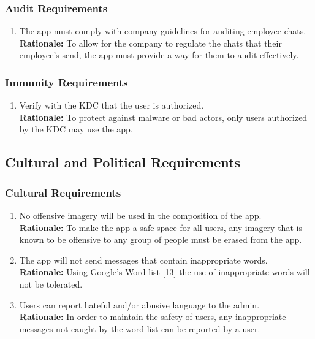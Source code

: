 \documentclass[]{article}
\begin{document}
\subsubsection{Audit Requirements}
\label{ssub:audit_requirements}
\begin{enumerate}[{SR-AU}1. ]
	\item The app must comply with company guidelines for auditing employee chats.
	      \\\textbf{Rationale:} To allow for the company to regulate the chats that their employee’s send, the app must provide a way for them to audit effectively.
\end{enumerate}

\subsubsection{Immunity Requirements}
\label{ssub:immunity_requirements}
\begin{enumerate}[{SR-IM}1. ]
	\item Verify with the KDC that the user is authorized.
	      \\\textbf{Rationale:} To protect against malware or bad actors, only users authorized by the KDC may use the app.
\end{enumerate}


\subsection{Cultural and Political Requirements}
\label{sub:cultural_and_political_requirements}

\subsubsection{Cultural Requirements}
\label{ssub:cultural_requirements}
\begin{enumerate}[{CP-C}1. ]
	\item No offensive imagery will be used in the composition of the app.
	      \\\textbf{Rationale:} To make the app a safe space for all users, any imagery that is known to be offensive to any group of people must be erased from the app.
	\item The app will not send messages that contain inappropriate words.
	      \\\textbf{Rationale:} Using Google’s Word list [13] the use of inappropriate words will not be tolerated.
	\item Users can report hateful and/or abusive language to the admin.
	      \\\textbf{Rationale:} In order to maintain the safety of users, any inappropriate messages not caught by the word list can be reported by a user.

\end{enumerate}
\end{document}
